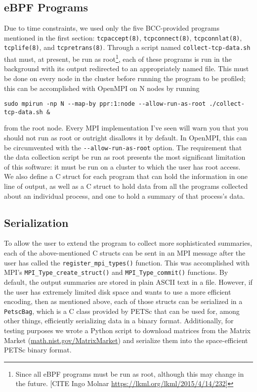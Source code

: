 \documentclass[11pt]{article}
\begin{document}
\subsection*{eBPF Programs}
Due to time constraints, we used only the five BCC-provided programs mentioned in the first section: \lstinline{tcpaccept(8)}, \lstinline{tcpconnect(8)}, \lstinline{tcpconnlat(8)}, \lstinline{tcplife(8)}, and \lstinline{tcpretrans(8)}. Through a script named \lstinline{collect-tcp-data.sh} that must, at present, be run as root\footnote{Since all eBPF programs must be run as root, although this may change in the future. [CITE Ingo Molnar \url{https://lkml.org/lkml/2015/4/14/232}]}, each of these programs is run in the background with its output redirected to an appropriately named file. This must be done on every node in the cluster before running the program to be profiled; this can be accomplished with OpenMPI on N nodes by running
\begin{Verbatim}
sudo mpirun -np N --map-by ppr:1:node --allow-run-as-root ./collect-tcp-data.sh &
\end{Verbatim}
from the root node. Every MPI implementation I've seen will warn you that you should not run as root or outright disallows it by default. In OpenMPI, this can be circumvented with the \lstinline{--allow-run-as-root} option. The requirement that the data collection script be run as root presents the most significant limitation of this software: it must be run on a cluster to which the user has root access. \\
We also define a C struct for each program that can hold the information in one line of output, as well as a C struct to hold data from all the programs collected about an individual process, and one to hold a summary of that process's data.
\subsection*{Serialization}
To allow the user to extend the program to collect more sophisticated summaries, each of the above-mentioned C structs can be sent in an MPI message after the user has called the \lstinline{register_mpi_types()} function. This was accomplished with MPI's \lstinline{MPI_Type_create_struct()} and \lstinline{MPI_Type_commit()} functions. By default, the output summaries are stored in plain ASCII text in a file. However, if the user has extremely limited disk space and wants to use a more efficient encoding, then as mentioned above, each of those structs can be serialized in a \lstinline{PetscBag}, which is a C class provided by PETSc that can be used for, among other things, efficiently serializing data in a binary format. Additionally, for testing purposes we wrote a Python script to download matrices from the Matrix Market (\url{math.nist.gov/MatrixMarket}) and serialize them into the space-efficient PETSc binary format. 
\end{document}
